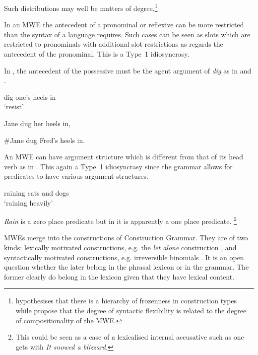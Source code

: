 \documentclass[output=paper]{langsci/langscibook}
\begin{document}
\noindent
Such distributions may well be matters of degree.\footnote{   \citet{Fraser1970} hypothesises that there is a hierarchy of frozenness in construction types while \citet{Nunberg1994} propose that the degree of syntactic flexibility is related to the degree of compositionality of the MWE.} 

In an MWE the antecedent of a pronominal or reflexive can be more restricted than the syntax of a language requires. Such cases can be seen as slots which are restricted to pronominals with additional slot restrictions as regards the antecedent of the pronominal. This is a Type~1 idiosyncrasy.

In , the antecedent of the possessive must be the agent argument of \textit{dig} as in  and .

\begin{exe}
\ex\label{ex:ex46} dig one's heels in\\
‘resist’ 
\begin{xlist}
\ex\label{ex:ex47} Jane dug her heels in,

\ex\label{ex:ex48} \#Jane dug Fred’s heels in.
\end{xlist}
\end{exe}

An MWE can have argument structure which is different from that of its head verb as in . This again a Type~1 idiosyncrasy since the grammar allows for predicates to have various argument structures.

\begin{exe}
\ex\label{ex:ex49} raining cats and dogs\\
‘raining heavily’
\end{exe}

\noindent
\textit{Rain} is a zero place predicate but in  it is 
apparently a one place predicate.%
\footnote{   This could be seen as a case of a lexicalised internal accusative such as one gets with \textit{It snowed a blizzard}.}  

MWEs merge into the constructions of Construction Grammar. They are of two kinds: lexically motivated constructions, e.g. the \textit{let alone} construction \citep{FillmoreEtAl1988}, and syntactically motivated constructions, e.g. irreversible binomials \citep{Malkiel1959}. It is an open question whether the later belong in the phrasal lexicon or in the grammar. The former clearly do belong in the lexicon given that they have lexical content.
\end{document}
